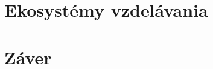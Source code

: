 \documentclass[10pt,twoside,slovak,a4paper]{article}
\begin{document}
\section{Ekosystémy vzdelávania} \label{ecosystems}



\section{Záver} \label{zaver} 



{}
\end{document}
